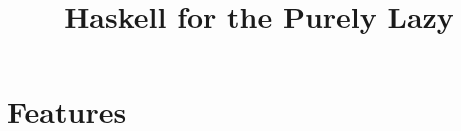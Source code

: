 \documentclass{beamer}
\title{Haskell for the Purely Lazy}
\begin{document}
\frame{\titlepage}

\section{Features}




\end{document}
